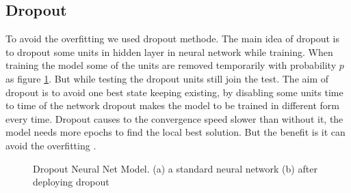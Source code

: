 \subsection{Dropout}
To avoid the overfitting we used dropout methode\cite{srivastava2014dropout}. The main idea of dropout is to dropout some units in hidden layer in neural network while training. When training the model some of the units are removed temporarily with probability $p$ as figure \ref{fig:Dropout}.  But while testing the dropout units still join the test. The aim of dropout is to avoid one best state keeping existing, by disabling some units time to time of the network dropout makes the model to be trained in different form every time.  Dropout causes to the convergence speed slower than without it, the model needs more epochs to find the local best solution. But the benefit is it can avoid the overfitting \cite{srivastava2014dropout}. 
\begin{figure}[!h]

  \centering


\caption{Dropout Neural Net Model. (a) a standard neural network (b) after deploying dropout  }
\label{fig:Dropout}
\end{figure}

